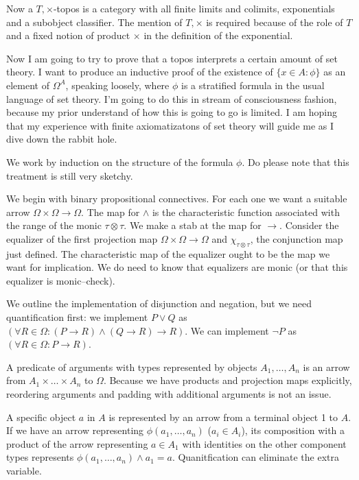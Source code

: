 \documentclass[12pt]{article}
\begin{document}
Now a $T,\times$-topos is a category with all finite limits and colimits, exponentials and a subobject classifier.  The mention of $T,\times$ is required because of the role of $T$ and a fixed notion of product $\times$ in the definition of the exponential.

Now I am going to try to prove that a topos interprets a certain amount of set theory.  I want to produce an inductive proof of the existence of $\{x \in A:\phi\}$ as an element
of $\Omega^A$, speaking loosely, where $\phi$ is a stratified formula in the usual language of set theory.  I'm going to do this in stream of consciousness fashion, because my prior understand of how this is going to go is limited.  I am hoping that my experience with finite axiomatizatons of set theory will guide me as I dive down the rabbit hole.

We work by induction on the structure of the formula $\phi$.  Do please note that this treatment is still very sketchy.

We begin with binary propositional connectives.  For each one we want a suitable arrow $\Omega \times \Omega\rightarrow \Omega$.  The map for $\wedge$ is the characteristic function
associated with the range of the monic $\tau \otimes \tau$.  We make a stab at the map for $\rightarrow$.  Consider the equalizer of the first projection map $\Omega \times \Omega\rightarrow \Omega$
and $\chi_{\tau \otimes \tau}$, the conjunction map just defined.   The characteristic map of the equalizer ought to be the map we want for implication.  We do need to know that equalizers are monic (or that this equalizer is monic--check).

We outline the implementation of disjunction and negation, but we need quantification first:  we implement $P \vee Q$ as $(\forall R \in \Omega:(P \rightarrow R) \wedge (Q \rightarrow R) \rightarrow R)$.  We can implement $\neg P$ as $(\forall R \in \Omega:P \rightarrow R)$.

A predicate of arguments with types represented by objects $A_1, \ldots, A_n$ is an arrow from $A_1 \times \ldots \times A_n$ to $\Omega$.  Because we have products and projection maps explicitly, reordering arguments and padding with additional arguments is not an issue.

A specific object $a$ in $A$ is represented by an arrow from a terminal object 1 to $A$.  If we have an arrow representing $\phi(a_1,\ldots,a_n)$ ($a_i \in A_i$), its composition with a product of
the arrow representing $a \in A_1$ with identities on the other component types represents $\phi(a_1,\ldots,a_n) \wedge a_1 = a$.  Quanitfication can eliminate the extra variable.
\end{document}
